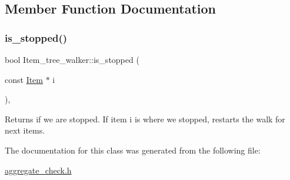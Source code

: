 \subsection{Member Function Documentation}
\mbox{\label{classItem__tree__walker_a0788f0594f8245041d292219696c4c4e}} 
\subsubsection{\texorpdfstring{is\+\_\+stopped()}{is\_stopped()}}
{\footnotesize\ttfamily bool Item\+\_\+tree\+\_\+walker\+::is\+\_\+stopped (\begin{DoxyParamCaption}\item[{const \mbox{\hyperlink{classItem}{Item}} $\ast$}]{i }\end{DoxyParamCaption})\hspace{0.3cm}{\ttfamily [inline]}, {\ttfamily [protected]}}

\begin{DoxyReturn}{Returns}
if we are stopped. If item \textquotesingle{}i\textquotesingle{} is where we stopped, restarts the walk for next items. 
\end{DoxyReturn}


The documentation for this class was generated from the following file\+:\begin{DoxyCompactItemize}
\item 
\mbox{\hyperlink{aggregate__check_8h}{aggregate\+\_\+check.\+h}}\end{DoxyCompactItemize}
